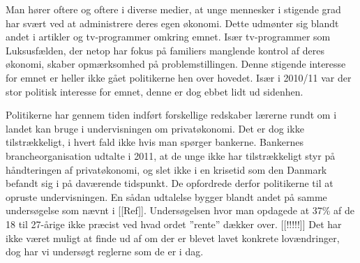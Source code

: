 Man hører oftere og oftere i diverse medier, at unge mennesker i stigende grad har svært ved at administrere deres egen økonomi. Dette udmønter sig blandt andet i artikler og tv-programmer omkring emnet. Især tv-programmer som Luksusfælden, der netop har fokus på familiers manglende kontrol af deres økonomi, skaber opmærksomhed på problemstillingen. Denne stigende interesse for emnet er heller ikke gået politikerne hen over hovedet. Især i 2010/11 var der stor politisk interesse for emnet, denne er dog ebbet lidt ud sidenhen.

Politikerne har gennem tiden indført forskellige redskaber lærerne rundt om i landet kan bruge i undervisningen om privatøkonomi. Det er dog ikke tilstrækkeligt, i hvert fald ikke hvis man spørger bankerne. Bankernes brancheorganisation udtalte i 2011, at de unge ikke har tilstrækkeligt styr på håndteringen af privatøkonomi, og slet ikke i en krisetid som den Danmark befandt sig i på daværende tidspunkt. De opfordrede derfor politikerne til at opruste undervisningen. En sådan udtalelse bygger blandt andet på samme  undersøgelse som nævnt i [[Ref]]. Undersøgelsen hvor man opdagede at 37\% af de 18 til 27-årige ikke præcist ved hvad ordet ”rente” dækker over. [[!!!!!]] Det har ikke været muligt at finde ud af om der er blevet lavet konkrete lovændringer, dog har vi undersøgt reglerne som de er i dag. 

